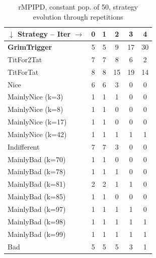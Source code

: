 \documentclass[journal,10pt,twoside]{IEEEtran}
\begin{document}
\begin{table}[ht]
    \caption{rMPIPD, constant pop. of 50, strategy evolution through repetitions}
    \label{tab:ripdmp-const}
    \centering
    \begin{tabular}{l|ccccc} \toprule
        $\downarrow$ Strategy -- Iter $\rightarrow$  & 0 & 1 & 2 & 3 & 4 \\ \midrule
        \textbf{GrimTrigger} &  5 &  5 &   9 &  17 &  30 \\
        TitFor2Tat        &  7 &  7 &   8 &   6 &   2 \\
        TitForTat         &  8 &  8 &  15 &  19 &  14 \\
        Nice              &  6 &  6 &   3 &   0 &   0 \\
        MainlyNice (k=3)  &  1 &  1 &   1 &   0 &   0 \\
        MainlyNice (k=8)  &  1 &  1 &   0 &   0 &   0 \\
        MainlyNice (k=17) &  1 &  1 &   0 &   0 &   0 \\
        MainlyNice (k=42) &  1 &  1 &   1 &   1 &   1 \\
        Indifferent       &  7 &  7 &   3 &   0 &   0 \\
        MainlyBad (k=70)  &  1 &  1 &   0 &   0 &   0 \\
        MainlyBad (k=78)  &  1 &  1 &   1 &   0 &   0 \\
        MainlyBad (k=81)  &  2 &  2 &   1 &   1 &   0 \\
        MainlyBad (k=85)  &  1 &  1 &   0 &   0 &   0 \\
        MainlyBad (k=97)  &  1 &  1 &   1 &   1 &   0 \\
        MainlyBad (k=98)  &  1 &  1 &   1 &   1 &   1 \\
        MainlyBad (k=99)  &  1 &  1 &   1 &   1 &   1 \\
        Bad               &  5 &  5 &   5 &   3 &   1 \\ \bottomrule
    \end{tabular}
\end{table}
\end{document}
